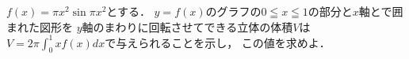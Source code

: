\documentclass[../../main.tex]{subfiles}
\begin{document}
$f(x)=\pi x^2 \sin \pi x^2$とする．
$y=f(x)$のグラフの$0 \leqq x \leqq 1$の部分と$x$軸とで囲まれた図形を
$y$軸のまわりに回転させてできる立体の体積$V$は
$\displaystyle V=2\pi\int_0^1 xf(x)dx$で与えられることを示し，
この値を求めよ．
\end{document}
